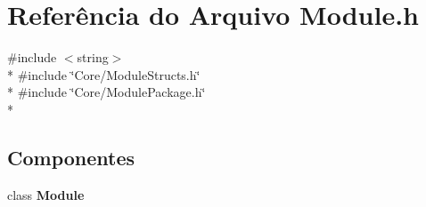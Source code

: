\section{Referência do Arquivo Module.\+h}
\label{_module_8h}
{\ttfamily \#include $<$string$>$}\\*
{\ttfamily \#include \char`\"{}Core/\+Module\+Structs.\+h\char`\"{}}\\*
{\ttfamily \#include \char`\"{}Core/\+Module\+Package.\+h\char`\"{}}\\*
\subsection*{Componentes}
\begin{DoxyCompactItemize}
\item 
class {\bf Module}
\end{DoxyCompactItemize}
